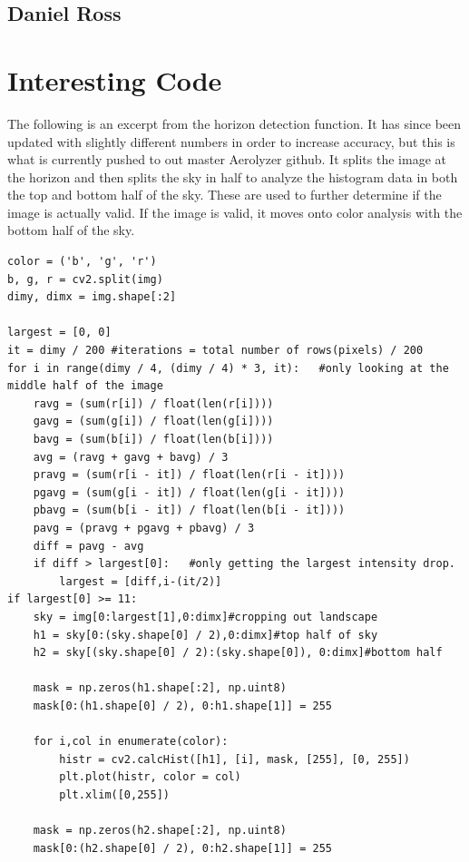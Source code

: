 \documentclass[onecolumn, draftclsnofoot,10pt, compsoc]{IEEEtran}
\begin{document}
\begin{singlespace}
		\subsection{Daniel Ross}
			
			
	\section{Interesting Code}
		The following is an excerpt from the horizon detection function.
		It has since been updated with slightly different numbers in order to increase accuracy, but this is what is currently pushed to out master Aerolyzer github.
		It splits the image at the horizon and then splits the sky in half to analyze the histogram data in both the top and bottom half of the sky.
		These are used to further determine if the image is actually valid.
		If the image is valid, it moves onto color analysis with the bottom half of the sky.
		\begin{lstlisting}
color = ('b', 'g', 'r')
b, g, r = cv2.split(img)
dimy, dimx = img.shape[:2]

largest = [0, 0]
it = dimy / 200 #iterations = total number of rows(pixels) / 200
for i in range(dimy / 4, (dimy / 4) * 3, it):   #only looking at the middle half of the image
	ravg = (sum(r[i]) / float(len(r[i])))
	gavg = (sum(g[i]) / float(len(g[i])))
	bavg = (sum(b[i]) / float(len(b[i])))
	avg = (ravg + gavg + bavg) / 3
	pravg = (sum(r[i - it]) / float(len(r[i - it])))
	pgavg = (sum(g[i - it]) / float(len(g[i - it])))
	pbavg = (sum(b[i - it]) / float(len(b[i - it])))
	pavg = (pravg + pgavg + pbavg) / 3
	diff = pavg - avg
	if diff > largest[0]:   #only getting the largest intensity drop.
		largest = [diff,i-(it/2)]
if largest[0] >= 11:
	sky = img[0:largest[1],0:dimx]#cropping out landscape
	h1 = sky[0:(sky.shape[0] / 2),0:dimx]#top half of sky
	h2 = sky[(sky.shape[0] / 2):(sky.shape[0]), 0:dimx]#bottom half

	mask = np.zeros(h1.shape[:2], np.uint8)
	mask[0:(h1.shape[0] / 2), 0:h1.shape[1]] = 255

	for i,col in enumerate(color):
		histr = cv2.calcHist([h1], [i], mask, [255], [0, 255])
		plt.plot(histr, color = col)
		plt.xlim([0,255])

	mask = np.zeros(h2.shape[:2], np.uint8)
	mask[0:(h2.shape[0] / 2), 0:h2.shape[1]] = 255


\end{lstlisting}
\end{singlespace}
\end{document}
